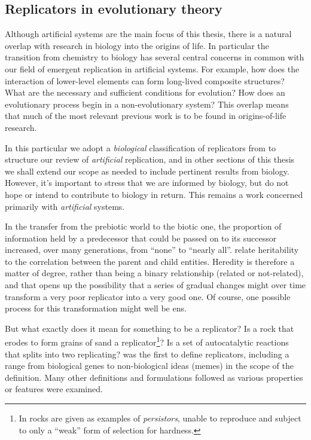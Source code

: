 \subsection{Replicators in evolutionary theory}\label{replicators-in-evolutionary-theory}

Although artificial systems are the main focus of this thesis, there is a natural overlap with research in biology into the origins of life. In particular the transition from chemistry to biology has several central concerns in common with our field of emergent replication in artificial systems. For example, how does the interaction of lower-level elements can form long-lived composite structures? What are the necessary and sufficient conditions for evolution? How does an evolutionary process begin in a non-evolutionary system? This overlap means that much of the most relevant previous work is to be found in origins-of-life research. 

In this particular  we adopt a \textit{biological} classification of replicators from \textcite{Zachar2010} to structure our review of \textit{artificial} replication, and in other sections of this thesis we shall extend our scope as needed to include pertinent results from biology. However, it's important to stress that we are informed by biology, but do not hope or intend to contribute to biology in return. This remains a work concerned primarily with \emph{artificial} systems. 

In the transfer from the prebiotic world to the biotic one, the proportion of information held by a predecessor that could be passed on to its successor increased, over many generations, from ``none'' to ``nearly all''. \Textcite{Vasas2012a} relate heritability to the correlation between the parent and child entities. Heredity is therefore a matter of degree, rather than being a binary relationship (related or not-related), and that opens up the possibility that a series of gradual changes might over time transform a very poor replicator into a very good one. Of course, one possible process for this transformation might well be \gls{ens}.

But what exactly does it mean for something to be a replicator? Is a rock that erodes to form grains of sand a replicator\footnote{In \textcite{Bourrat2015} rocks are given as examples of \emph{persistors}, unable to reproduce and subject to only a ``weak'' form of selection for hardness.}? Is a set of autocatalytic reactions that splits into two replicating? \Textcite{Dawkins1976} was the first to define replicators, including a range from biological genes to non-biological ideas (memes) in the scope of the definition. Many other definitions and formulations followed as various properties or features were examined. 

